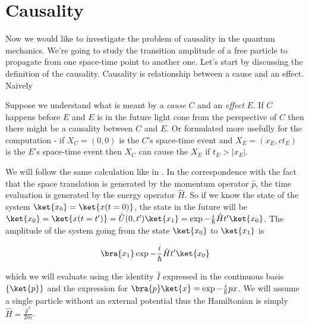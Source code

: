 \section{Causality}

Now we would like to investigate the problem of causality in the quantum mechanics. We're going to study the transition
amplitude of a free particle to propagate from one space-time point to another one. Let's start by discussing the definition
of the causality. Causality is relationship between a cause and an effect. Naively

\begin{definition}
    \label{df:causality}
    Suppose we understand what is meant by a \textit{cause} $C$ and an \textit{effect} $E$. If $C$ happens before $E$ and 
    $E$ is in the future light cone from the perspective of $C$ then there might be a causality between $C$ and $E$.  Or
    formulated more usefully for the computation - if $X_{C} = (0, 0)$ is the $C$'s space-time event and 
    $X_{E} = (x_{E}, ct_{E})$ is the $E$'s space-time event then $X_{C}$ can cause the $X_{E}$ if $t_{E} > |x_{E}|$.
\end{definition}

We will follow the same calculation like in \cite{peskin_schroeder}. In the correspondence with the fact that the space translation
is generated by the momentum operator $\hat{p}$, the time evaluation is generated by the energy operator $\hat{H}$. So
if we know the state of the system $\ket{x_{0}} = \ket{x(t=0)}$, the state in the future will be 
$\ket{x_{0}} = \ket{x(t=t')} = \hat{U}(0, t') \ket{x_{1}} = \exp{- \frac{i}{\hbar} \hat{H} t'} \ket{x_{0}}$. The amplitude of the
system going from the state $\ket{x_{0}}$ to $\ket{x_{1}}$ is 

\begin{equation}
    \bra{x_{1}} \exp{- \frac{i}{\hbar} \hat{H} t'}\ket{x_{0}}
\end{equation}

which we will evaluate using the identity $\hat{I}$ expressed in the continuous basis $\{\ket{p}\}$ and the expression for
$\bra{p}\ket{x} = \exp{- \frac{i}{\hbar} p x}$. We will assume a single particle without an external potential thus the
Hamiltonian is simply $\hat{H} = \frac{\hat{p}^{2}}{2m}$.

